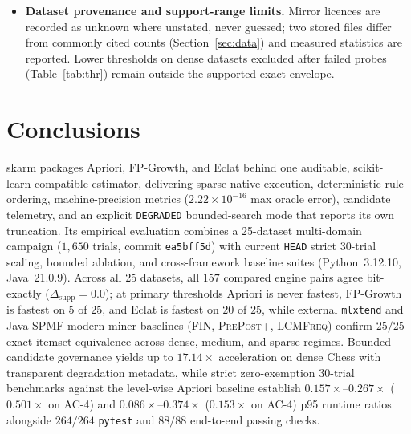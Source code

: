 \documentclass[journal,a4paper]{IEEEtran}
\newcommand{\skarm}{skarm\xspace}
\begin{document}
\begin{itemize}
  unique binary/unsupervised checks, $1$ skipped, $0$ unexpected failures in
  Section~\ref{sec:estimator-checks}). In contrast, \skarm's dedicated
  binary-transaction estimator contract suite evaluates all $7/7$ required API
  behaviors (\texttt{fit}, \texttt{transform}, \texttt{predict},
  \texttt{clone}, \texttt{get\_params}/\texttt{set\_params}, pipeline
  composition, and serialization) with $100\%$ pass rate.
  \item \textbf{Dataset provenance and support-range limits.} Mirror licences
  are recorded as unknown where unstated, never guessed; two stored files
  differ from commonly cited counts (Section~\ref{sec:data}) and measured
  statistics are reported. Lower thresholds on dense datasets excluded after
  failed probes (Table~\ref{tab:thr}) remain outside the supported exact envelope.
\end{itemize}

\section{Conclusions}
\skarm packages Apriori, FP-Growth, and Eclat behind one auditable,
scikit-learn-compatible estimator, delivering sparse-native execution,
deterministic rule ordering, machine-precision metrics ($2.22 \times 10^{-16}$
max oracle error), candidate telemetry, and an explicit \texttt{DEGRADED}
bounded-search mode that reports its own truncation. Its empirical evaluation
combines a 25-dataset multi-domain campaign ($1{,}650$ trials, commit
\texttt{ea5bff5d}) with current \texttt{HEAD} strict 30-trial scaling,
bounded ablation, and cross-framework baseline suites (Python~3.12.10,
Java~21.0.9). Across all 25 datasets, all $157$ compared engine pairs agree
bit-exactly ($\Delta_{\mathrm{supp}}=0.0$); at primary thresholds Apriori is
never fastest, FP-Growth is fastest on $5$ of $25$, and Eclat is fastest on
$20$ of $25$, while external \texttt{mlxtend} and Java SPMF modern-miner
baselines (\textsc{FIN}, \textsc{PrePost+}, \textsc{LCMFreq}) confirm $25/25$
exact itemset equivalence across dense, medium, and sparse regimes. Bounded
candidate governance yields up to $17.14\times$ acceleration on dense Chess
with transparent degradation metadata, while strict zero-exemption 30-trial
benchmarks against the level-wise Apriori baseline establish $0.157\times$--$0.267\times$
($0.501\times$ on AC-4) and $0.086\times$--$0.374\times$ ($0.153\times$ on
AC-4) p95 runtime ratios alongside $264/264$ \texttt{pytest} and $88/88$
end-to-end passing checks.
\end{document}
